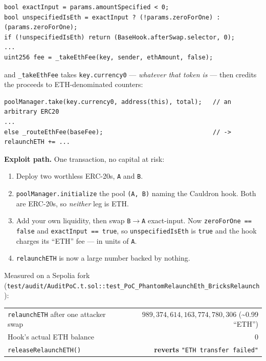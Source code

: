 \documentclass[10pt,a4paper]{article}
\newcommand{\code}[1]{\texttt{\small #1}}
\begin{document}
\begin{lstlisting}[firstnumber=635]
bool exactInput = params.amountSpecified < 0;
bool unspecifiedIsEth = exactInput ? (!params.zeroForOne) : (params.zeroForOne);
if (!unspecifiedIsEth) return (BaseHook.afterSwap.selector, 0);
...
uint256 fee = _takeEthFee(key, sender, ethAmount, false);
\end{lstlisting}

\noindent and \code{\_takeEthFee} takes \code{key.currency0} --- \emph{whatever
that token is} --- then credits the proceeds to ETH-denominated counters:

\begin{lstlisting}[firstnumber=961]
poolManager.take(key.currency0, address(this), total);   // an arbitrary ERC20
...
else _routeEthFee(baseFee);                              // -> relaunchETH += ...
\end{lstlisting}

\textbf{Exploit path.} One transaction, no capital at risk:
\begin{enumerate}
\item Deploy two worthless ERC-20s, \code{A} and \code{B}.
\item \code{poolManager.initialize} the pool \code{(A, B)} naming the Cauldron
hook. Both are ERC-20s, so \emph{neither} leg is ETH.
\item Add your own liquidity, then swap \code{B}$\to$\code{A} exact-input. Now
\code{zeroForOne == false} and \code{exactInput == true}, so
\code{unspecifiedIsEth} is \code{true} and the hook charges its ``ETH'' fee ---
in units of \code{A}.
\item \code{relaunchETH} is now a large number backed by nothing.
\end{enumerate}

\noindent Measured on a Sepolia fork
(\code{test/audit/AuditPoC.t.sol::test\_PoC\_PhantomRelaunchEth\_BricksRelaunch}):

\begin{center}\small
\begin{tabular}{@{}lr@{}}
\toprule
\code{relaunchETH} after one attacker swap & $989{,}374{,}614{,}163{,}774{,}780{,}306$ (\textasciitilde{}0.99 ``ETH'') \\
Hook's actual ETH balance & $0$ \\
\code{releaseRelaunchETH()} & \textbf{reverts} \code{"ETH transfer failed"} \\
\bottomrule
\end{tabular}
\end{center}
\end{document}
